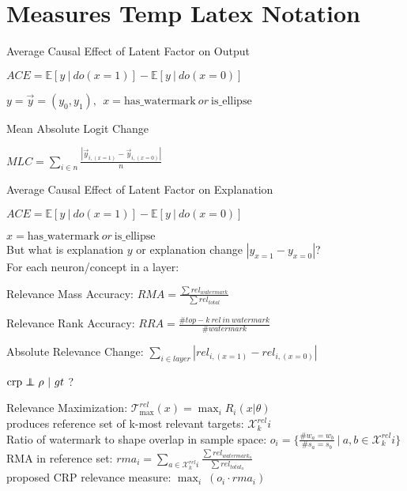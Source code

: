 \section{Measures Temp Latex Notation}

\begin{center}
    Average Causal Effect of Latent Factor on Output

    $\displaystyle ACE = \mathbb{E} [ y \ | \ do(x=1) ] - \mathbb{E} [ y \ | \ do(x=0) ]$
    \vspace{0.5cm}

    $y = \vec{y} = (y_0, y_1), \ \ x = \mathrm{has\_watermark} \ or \ \mathrm{is\_ellipse}$
    \vspace{0.5cm}

    Mean Absolute Logit Change

    $\displaystyle MLC = \sum_{i \in n} \frac{|\vec{y}_{i, (x=1)}- \vec{y}_{i, (x=0)} |}{n}$


\end{center}


\begin{center}
    Average Causal Effect of Latent Factor on Explanation

    $\displaystyle ACE = \mathbb{E} [ y \ | \ do(x=1) ] - \mathbb{E} [ y \ | \ do(x=0) ]$
    \vspace{0.5cm}

    $x = \mathrm{has\_watermark} \ or \ \mathrm{is\_ellipse}$ \\
    But what is explanation $y$ or explanation change $|y_{x=1} - y_{x=0}|$?  \\
    For each neuron/concept in a layer:
    \vspace{0.4cm}

    Relevance Mass Accuracy: $\displaystyle RMA = \frac{\sum rel_{watermark}}{\sum rel_{total}}$
    \vspace{0.4cm}

    Relevance Rank Accuracy: $\displaystyle RRA = \frac{\# top-k \ rel \ in \ watermark}{\# watermark}$
    \vspace{0.4cm}

    Absolute Relevance Change: $\displaystyle \sum_{i \in layer} |rel_{i, (x=1)}- rel_{i, (x=0)} | $
    \vspace{0.4cm}

    $\mathrm{crp}  \independent \rho \ | \ gt $ ?
\end{center}
\newpage

\begin{center}
    Relevance Maximization:  $\mathcal{T}_{\max}^{rel}(x) = \max_i R_i(x|\theta)$ \\
    produces reference set of k-most relevant targets: $\mathcal{X}_k^{rel}i$ \\
    Ratio of watermark to shape overlap in sample space: $\displaystyle o_i =  \{
        \frac{\#  w_a = w_b}{\#  s_a = s_b} \ | \  a, b \in \mathcal{X}_k^{rel}i
        \}   $ \\
    RMA in reference set: $\displaystyle rma_i = \sum_{a \in \mathcal{X}_k^{rel}i} \frac{\sum rel_{watermark_a}}{\sum rel_{total_a}}$ \\
    proposed CRP relevance measure: $\displaystyle \max_i \ (o_i \cdot rma_i)$
\end{center}